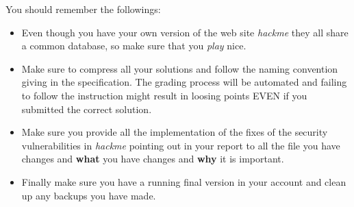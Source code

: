 \documentclass[]{article}
\begin{document}
You should remember the followings:
\begin{itemize}
	\item Even though you have your own version of the web site \textit{hackme} they all share a common database, so make sure that you \emph{play} nice.
	\item Make sure to compress all your solutions and follow the naming convention giving in the specification. The grading process will be automated and failing to follow the instruction might result in loosing points EVEN if you submitted the correct solution.
	\item Make sure you provide all the implementation of the fixes of the security vulnerabilities in \textit{hackme} pointing out in your report to all the file you have changes and \textbf{what} you have changes and \textbf{why} it is important.
	\item Finally make sure you have a running final version in your account and clean up any backups you have made.
\end{itemize}
\end{document}
